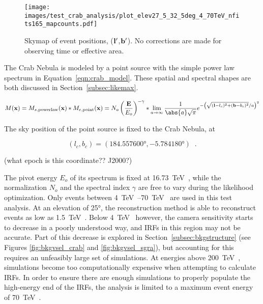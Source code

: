   \begin{figure}[!t]
    \centering
    \texttt{[image: images/test\_crab\_analysis/plot\_elev27\_5\_32\_5deg\_4\_70TeV\_nfits165\_mapcounts.pdf]}
    \caption[Crab Nebula Counts Skymap]
    {
      Skymap of event positions, ($\mathbf{l'}$,$\mathbf{b'}$).
      No corrections are made for observing time or effective area.
    }
    \label{fig:crab_skymap}
  \end{figure}
  
  The Crab Nebula is modeled by a point source with the simple power law spectrum in Equation~\ref{eqn:crab_model}.
  These spatial and spectral shapes are both discussed in Section~\ref{subsec:likemax}.

  \begin{equation}\label{eqn:crab_model}
    M(\xtrue) = M_{s,\textrm{powerlaw}}(\xtrue) * M_{e,\textrm{point}}(\xtrue) = N_o \left ( \frac{\Etrue}{E_o} \right )^{-\gamma} * \lim_{a\to\infty} \frac{1}{ \abs{a} \sqrt{\pi} } e^{ - \left ( \sqrt{ (\ltrue-l_c)^2 + (\btrue-b_c)^2 }/a \right )^2 }
  \end{equation}

  The sky position of the point source is fixed to the Crab Nebula, at

  $$(l_c,b_c) = (\ang{184.557600},\ang{-5.784180}) \;\;.$$
  
  {\color{red}(what epoch is this coordinate?? J2000?)}

  The pivot energy $E_o$ of its spectrum is fixed at \SI{16.73}{\TeV{}}, while the normalization $N_o$ and the spectral index $\gamma$ are free to vary during the likelihood optimization.
  Only events between \SIrange{4}{70}{\TeV{}} are used in this test analysis.
  At an elevation of \ang{25}, the reconstruction method is able to reconstruct events as low as \SI{1.5}{\TeV{}}.
  Below \SI{4}{\TeV{}} however, the camera sensitivity starts to decrease in a poorly understood way, and IRFs in this region may not be accurate.
  Part of this decrease is explored in Section~\ref{subsec:bkgstructure} (see Figures \ref{fig:bkgvsel_crab} and \ref{fig:bkgvsel_sgra}), but accounting for this requires an unfeasibly large set of simulations.
  At energies above \SI{200}{\TeV{}}, simulations become too computationally expensive when attempting to calculate IRFs.
  In order to ensure there are enough simulations to properly populate the high-energy end of the IRFs, the analysis is limited to a maximum event energy of \SI{70}{\TeV{}}.
    
